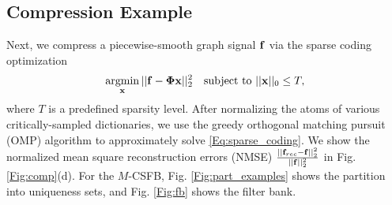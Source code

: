 \documentclass[journal, 10pt]{IEEEtran}
\begin{document}
\subsection{Compression Example}
Next, we compress 
a piecewise-smooth graph signal ${\bf f}$ via the sparse coding optimization
\begin{align}\label{Eq:sparse_coding}
\argmin_{\bf x}   || {\bf f}-\boldsymbol{\Phi}{\bf x} ||_2^2 \hbox{~~~subject to } ||{\bf x}||_0 \leq T,
\end{align}
where $T$ is a predefined sparsity level. After %
normalizing the atoms of various critically-sampled dictionaries, we use the greedy %
 orthogonal matching pursuit (OMP) algorithm \cite{tropp2004greed,elad_book} to approximately solve \eqref{Eq:sparse_coding}. 
  We show the normalized mean square reconstruction errors (NMSE) $\frac{\left|\left|{\bf f}_{{rec}}-{\bf f}\right|\right|_2^2}{||{\bf f}||_2^2}$ in Fig. \ref{Fig:comp}(d). 
 For the $M$-CSFB, %
 Fig. \ref{Fig:part_examples} shows 
 the partition into uniqueness sets, and  
 Fig. \ref{Fig:fb} shows the filter bank.
\end{document}
